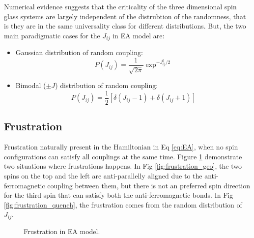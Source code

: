 Numerical evidence suggests that the criticality of the three dimensional
spin glass systems are largely independent of the distrubtion of the randomness,
that is they are in the same universality class for different distributions. 
But, the two main paradigmatic cases for the $J_{ij}$ in EA model are:
\begin{itemize}
\item Gaussian distribution of random coupling:
  \begin{equation}
    \label{eq:Jij_Gaussian}
    P(J_{ij})=\frac{1}{\sqrt{2\pi}}\exp^{-J_{ij}^2/2}
  \end{equation}
\item Bimodal ($\pm J$) distribution of random coupling:
  \begin{equation}
    \label{eq:Jij_bimodal}
    P(J_{ij})=\frac{1}{2}[\delta(J_{ij}-1)+\delta(J_{ij}+1)]
  \end{equation}
\end{itemize}

\subsection{Frustration}
\label{sec:frustration}
Frustration naturally present in the Hamiltonian in Eq \ref{eq:EA}, when no spin 
configurations can satisfy all couplings at the same time. 
Figure \ref{fig:frustration} demonstrate two situations where frustrations 
happens. In Fig \ref{fig:frustration_geo}, the two spins on the top and the left
are anti-parallelly aligned due to the anti-ferromagnetic coupling between them,
but there is not an preferred spin direction for the third spin that can satisfy
both the anti-ferromagnetic bonds. In Fig \ref{fig:frustration_quench}, the 
frustration comes from the random distribution of $J_{ij}$. 

\begin{figure}
  \centering
  \hspace{0.5cm}
  \caption{Frustration in EA model.}
  \label{fig:frustration}
\end{figure}

